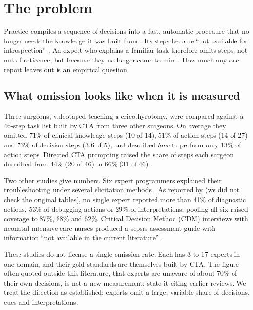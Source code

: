 \section{The problem}\label{sec:problem}

\evlit{} Practice compiles a sequence of decisions into a fast, automatic procedure that no longer
needs the knowledge it was built from \parencite{anderson1982acquisition}. Its steps become
\enquote{not available for introspection} \parencite[p.~584]{clark2008cognitive}. An expert who
explains a familiar task therefore omits steps, not out of reticence, but because they no longer
come to mind. How much any one report leaves out is an empirical question.

\subsection{What omission looks like when it is measured}

\begin{evlitbox}
  Three surgeons, videotaped teaching a cricothyrotomy, were compared against a 46-step task list
  built by CTA from three other surgeons. On average they omitted 71\% of clinical-knowledge steps
  (10 of 14), 51\% of action steps (14 of 27) and 73\% of decision steps (3.6 of 5), and described
  \emph{how} to perform only 13\% of action steps. Directed CTA prompting raised the share of steps
  each surgeon described from 44\% (20 of 46) to 66\% (31 of 46) \parencite{sullivan2014use}.
\end{evlitbox}

\evlit{} Two other studies give numbers. Six expert programmers explained their troubleshooting
under several elicitation methods \parencite{chao1994percentage}. As reported by
\textcite[p.~585]{clark2008cognitive} (we did not check the original tables), no single expert reported
more than 41\% of diagnostic actions, 53\% of debugging actions or 29\% of interpretations; pooling all
six raised coverage to 87\%, 88\% and 62\%.
Critical Decision Method (CDM) interviews with neonatal intensive-care nurses produced a
sepsis-assessment guide with information \enquote{not available in the current literature}
\parencite{crandall1993critical}.

\evint{} These studies do not license a single omission rate. Each has 3 to 17 experts in one domain,
and their gold standards are themselves built by CTA. The figure often quoted outside this
literature, that experts are unaware of about 70\% of their own decisions, is not a new measurement;
\textcite[p.~591]{clark2008cognitive} state it citing earlier reviews. We treat the direction as
established: experts omit a large, variable share of decisions, cues and interpretations.

